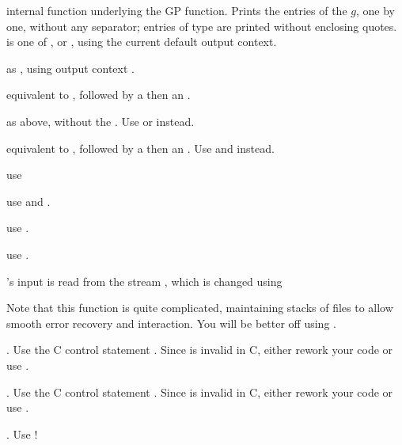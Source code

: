 
 internal function underlying the
 GP function. Prints the entries of the  $g$, one by one,
without any separator; entries of type  are printed without enclosing
quotes. \fl is one of ,  or , using the
current default output context.

 as ,
using output context .

 equivalent to , followed
by a  then an .

 as above, without the . Use
 or  instead.

 equivalent to , followed
by a  then an . Use  and
 instead.


 use 

 use  and
.

 use .

 use .


's input is read from the stream , which is changed
using


Note that this function is quite complicated, maintaining stacks of files
to allow smooth error recovery and  interaction. You will be better
off using .


. Use the C control statement . Since
 is invalid in C, either rework your code or use .

. Use the C control statement . Since
 is invalid in C, either rework your code or use .

. Use !

